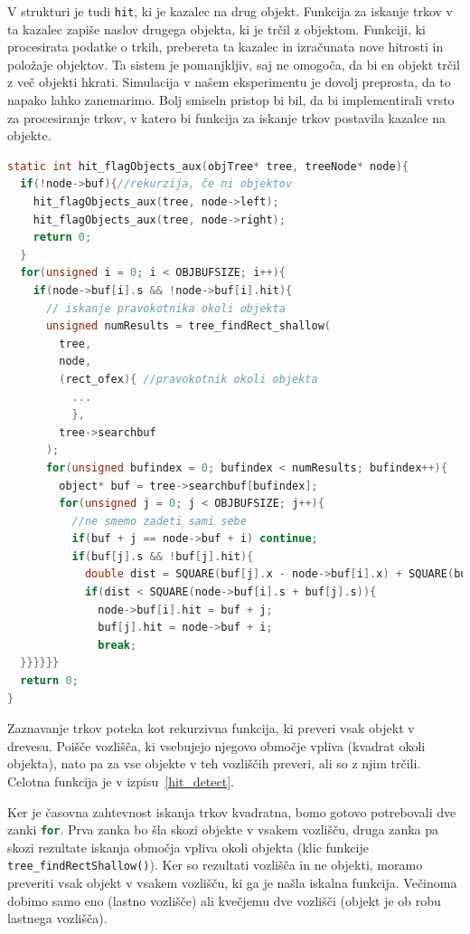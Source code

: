\documentclass[a4paper,12pt]{article}
\begin{document}
V strukturi je tudi \lstinline|hit|, ki je kazalec na drug objekt. Funkcija za iskanje trkov v ta kazalec zapiše naslov
drugega objekta, ki je trčil z objektom. Funkciji, ki procesirata podatke o trkih, prebereta
ta kazalec in izračunata nove hitrosti in položaje objektov. Ta sistem je pomanjkljiv, saj ne omogoča,
da bi en objekt trčil z več objekti hkrati. Simulacija v našem eksperimentu je dovolj preprosta, da to napako
lahko zanemarimo. Bolj smiseln pristop bi bil, da bi implementirali vrsto za procesiranje trkov, v katero
bi funkcija za iskanje trkov postavila kazalce na objekte.

\begin{lstlisting}[float, breaklines=true, postbreak=\mbox{\textcolor{purple}{$\hookrightarrow$}\space}, caption={Zaznava trkov}, label=hit_detect, language=C]
static int hit_flagObjects_aux(objTree* tree, treeNode* node){
  if(!node->buf){//rekurzija, če ni objektov
    hit_flagObjects_aux(tree, node->left);
    hit_flagObjects_aux(tree, node->right);
    return 0;
  }
  for(unsigned i = 0; i < OBJBUFSIZE; i++){
    if(node->buf[i].s && !node->buf[i].hit){      
      // iskanje pravokotnika okoli objekta
      unsigned numResults = tree_findRect_shallow(
        tree,
        node,
        (rect_ofex){ //pravokotnik okoli objekta
          ...
          },
        tree->searchbuf
      );
      for(unsigned bufindex = 0; bufindex < numResults; bufindex++){
        object* buf = tree->searchbuf[bufindex];
        for(unsigned j = 0; j < OBJBUFSIZE; j++){
          //ne smemo zadeti sami sebe
          if(buf + j == node->buf + i) continue; 
          if(buf[j].s && !buf[j].hit){
            double dist = SQUARE(buf[j].x - node->buf[i].x) + SQUARE(buf[j].y - node->buf[i].y);            
            if(dist < SQUARE(node->buf[i].s + buf[j].s)){
              node->buf[i].hit = buf + j;
              buf[j].hit = node->buf + i;
              break;
  }}}}}}
  return 0;
}
\end{lstlisting}

Zaznavanje trkov poteka kot rekurzivna funkcija, ki preveri vsak objekt v drevesu. Poišče vozlišča,
ki vsebujejo njegovo območje vpliva (kvadrat okoli objekta), nato pa za vse objekte v teh vozliščih preveri,
ali so z njim trčili. Celotna funkcija je v izpisu~\ref{hit_detect}.

Ker je časovna zahtevnost iskanja trkov kvadratna, bomo gotovo potrebovali dve zanki \lstinline[language=C]|for|.
Prva zanka bo šla skozi objekte v vsakem vozlišču, druga zanka pa skozi rezultate iskanja območja vpliva okoli
objekta (klic funkcije \lstinline|tree_findRectShallow()|). Ker so rezultati vozlišča in ne objekti, moramo preveriti vsak
objekt v vsakem vozlišču, ki ga je našla iskalna funkcija. Večinoma dobimo samo eno (lastno vozlišče) ali kvečjemu dve
vozlišči (objekt je ob robu lastnega vozlišča).
\end{document}
